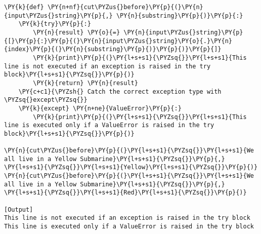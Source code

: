 \begin{Verbatim}[label=\makebox{\url{https://github.com/lucabaldini/cmepda/tree/master/slides/latex/snippets/exceptions\_brief.py}},commandchars=\\\{\}]
\PY{k}{def} \PY{n+nf}{cut\PYZus{}before}\PY{p}{(}\PY{n}{input\PYZus{}string}\PY{p}{,} \PY{n}{substring}\PY{p}{)}\PY{p}{:}
    \PY{k}{try}\PY{p}{:}
        \PY{n}{result} \PY{o}{=} \PY{n}{input\PYZus{}string}\PY{p}{[}\PY{p}{:}\PY{p}{(}\PY{n}{input\PYZus{}string}\PY{o}{.}\PY{n}{index}\PY{p}{(}\PY{n}{substring}\PY{p}{)}\PY{p}{)}\PY{p}{]}
        \PY{k}{print}\PY{p}{(}\PY{l+s+s1}{\PYZsq{}}\PY{l+s+s1}{This line is not executed if an exception is raised in the try block}\PY{l+s+s1}{\PYZsq{}}\PY{p}{)}
        \PY{k}{return} \PY{n}{result}
    \PY{c+c1}{\PYZsh{} Catch the correct exception type with \PYZsq{}except\PYZsq{}}
    \PY{k}{except} \PY{n+ne}{ValueError}\PY{p}{:}
        \PY{k}{print}\PY{p}{(}\PY{l+s+s1}{\PYZsq{}}\PY{l+s+s1}{This line is executed only if a ValueError is raised in the try block}\PY{l+s+s1}{\PYZsq{}}\PY{p}{)}

\PY{n}{cut\PYZus{}before}\PY{p}{(}\PY{l+s+s1}{\PYZsq{}}\PY{l+s+s1}{We all live in a Yellow Submarine}\PY{l+s+s1}{\PYZsq{}}\PY{p}{,} \PY{l+s+s1}{\PYZsq{}}\PY{l+s+s1}{Yellow}\PY{l+s+s1}{\PYZsq{}}\PY{p}{)}
\PY{n}{cut\PYZus{}before}\PY{p}{(}\PY{l+s+s1}{\PYZsq{}}\PY{l+s+s1}{We all live in a Yellow Submarine}\PY{l+s+s1}{\PYZsq{}}\PY{p}{,} \PY{l+s+s1}{\PYZsq{}}\PY{l+s+s1}{Red}\PY{l+s+s1}{\PYZsq{}}\PY{p}{)}

[Output]
This line is not executed if an exception is raised in the try block
This line is executed only if a ValueError is raised in the try block
\end{Verbatim}